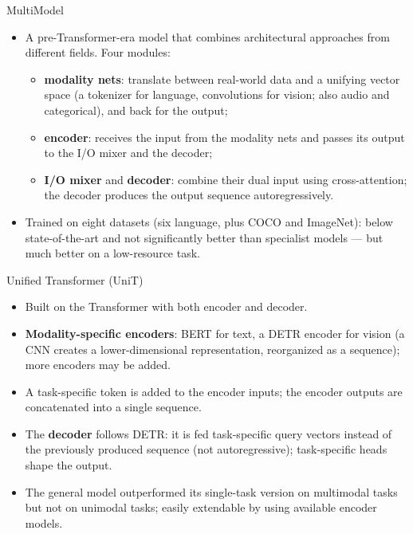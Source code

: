 \begin{frame}{MultiModel}
\begin{itemize}
  \item A pre-Transformer-era model that combines architectural approaches from different fields. Four modules:
  \begin{itemize}
    \item \textbf{modality nets}: translate between real-world data and a unifying vector space (a tokenizer for language, convolutions for vision; also audio and categorical), and back for the output;
    \item \textbf{encoder}: receives the input from the modality nets and passes its output to the I/O mixer and the decoder;
    \item \textbf{I/O mixer} and \textbf{decoder}: combine their dual input using cross-attention; the decoder produces the output sequence autoregressively.
  \end{itemize}
  \item Trained on eight datasets (six language, plus COCO and ImageNet): below state-of-the-art and not significantly better than specialist models --- but much better on a low-resource task.
\end{itemize}
\end{frame}

\begin{frame}{Unified Transformer (UniT)}
\begin{itemize}
  \item Built on the Transformer with both encoder and decoder.
  \item \textbf{Modality-specific encoders}: BERT for text, a DETR encoder for vision (a CNN creates a lower-dimensional representation, reorganized as a sequence); more encoders may be added.
  \item A task-specific token is added to the encoder inputs; the encoder outputs are concatenated into a single sequence.
  \item The \textbf{decoder} follows DETR: it is fed task-specific query vectors instead of the previously produced sequence (not autoregressive); task-specific heads shape the output.
  \item The general model outperformed its single-task version on multimodal tasks but not on unimodal tasks; easily extendable by using available encoder models.
\end{itemize}
\end{frame}

